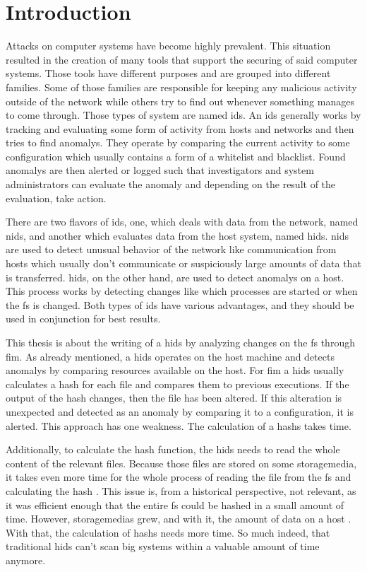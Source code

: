 \chapter{Introduction}

Attacks on computer systems have become highly prevalent. This situation resulted in the creation of many tools that support the securing of said computer systems. Those tools have different purposes and are grouped into different families. Some of those families are responsible for keeping any malicious activity outside of the network while others try to find out whenever something manages to come through. Those types of system are named \gls{ids}. An \gls{ids} generally works by tracking and evaluating some form of activity from hosts and networks and then tries to find \glspl{anomaly}. They operate by comparing the current activity to some configuration which usually contains a form of a whitelist and blacklist. Found \glspl{anomaly} are then alerted or logged such that investigators and system administrators can evaluate the \gls{anomaly} and depending on the result of the evaluation, take action. \cite{hidsnids}

There are two flavors of \gls{ids}, one, which deals with data from the network, named \gls{nids}, and another which evaluates data from the host system, named \gls{hids}. \gls{nids} are used to detect unusual behavior of the network like communication from hosts which usually don't communicate or suspiciously large amounts of data that is transferred. \gls{hids}, on the other hand, are used to detect \glspl{anomaly} on a host. This process works by detecting changes like which processes are started or when the \gls{fs} is changed. Both types of \gls{ids} have various advantages, and they should be used in conjunction for best results. \cite{hidsnids}

This thesis is about the writing of a \gls{hids} by analyzing changes on the \gls{fs} through \gls{fim}. As already mentioned, a \gls{hids} operates on the host machine and detects \glspl{anomaly} by comparing resources available on the host. For \gls{fim} a \gls{hids} usually calculates a \gls{hash} for each file and compares them to previous executions. If the output of the \gls{hash} changes, then the file has been altered. If this alteration is unexpected and detected as an \gls{anomaly} by comparing it to a configuration, it is alerted. This approach has one weakness. The calculation of a \glspl{hash} takes time.

Additionally, to calculate the hash function, the \gls{hids} needs to read the whole content of the relevant files. Because those files are stored on some \gls{storagemedia}, it takes even more time for the whole process of reading the file from the \gls{fs} and calculating the hash \cite{hash:slow, hash:speed}. This issue is, from a historical perspective, not relevant, as it was efficient enough that the entire \gls{fs} could be hashed in a small amount of time. However, \glspl{storagemedia} grew, and with it, the amount of data on a host \cite{bruce:imaging}. With that, the calculation of \glspl{hash} needs more time. So much indeed, that traditional \gls{hids} can't scan big systems within a valuable amount of time anymore.


